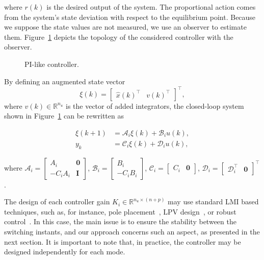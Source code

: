 where \(r(k)\) is the desired output of the system. The proportional action
comes from the system's state deviation with respect to the equilibrium point.
Because we suppose the state values are not measured, we use an observer to
estimate them. Figure~\ref{fig:pi-controller-diagram} depicts the topology of
the considered controller with the observer.

\begin{figure}[!htb]
	\centering
	\resizebox{0.98\linewidth}{!}{}
	\caption{PI-like controller.}%
	\label{fig:pi-controller-diagram}
\end{figure}

By defining an augmented state vector
\[
	\xi(k)=\begin{bmatrix}{\hat{x}(k)}^\top &v{(k)}^\top\end{bmatrix}^\top,
\]
where \(v(k)\in\mathbb{R}^{n_u}\) is the vector of added integrators, the
closed-loop system shown in Figure~\ref{fig:pi-controller-diagram} can be
rewritten as

\begin{equation}
	\label{sistemaaum}
	\begin{split}
		\xi(k+1) &= \mathcal{A}_i\xi(k)+\mathcal{B}_{i}u(k), \\
		y_{k}    &= \mathcal{C}_i\xi(k)+\mathcal{D}_{i}u(k),
	\end{split}
\end{equation}

where \(\mathcal{A}_i=\begin{bmatrix}A_i & \textbf{0} \\-C_{i}A_i&\textbf{I}
\end{bmatrix} \), \(\mathcal{B}_i=\begin{bmatrix}B_i\\-C_{i}B_i\end{bmatrix}\),
\(\mathcal{C}_i=\begin{bmatrix} C_i & \textbf{0} \end{bmatrix}\),
\(\mathcal{D}_i=\begin{bmatrix}\mathcal{D}_i^\top&\textbf{0}\end{bmatrix}^\top\).

The design of each controller gain \(K_i\in\mathbb{R}^{n_u\times{}(n+p)}\) may use
standard LMI based techniques, such as, for instance, pole
placement~\parencite{yu:lmis}, LPV design~\parencite{briat:linear}, or robust
control~\parencite{boyd.ghaoui.ea:linear}. In this case, the main issue is to
ensure the stability between the switching instants, and our approach concerns
such an aspect, as presented in the next section. It is important to note that,
in practice, the controller may be designed independently for each mode.

